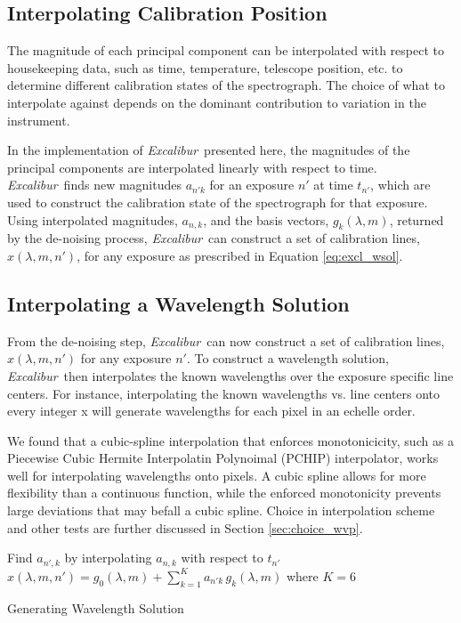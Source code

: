 \documentclass[modern]{aastex63}
\newcommand{\project}[1]{\textsl{#1}}
\newcommand{\name}{\project{Excalibur}}
\begin{document}
\subsection{Interpolating Calibration Position}
 \label{sec:interp_time}
The magnitude of each principal component can be interpolated with respect to housekeeping data, such as time, temperature, telescope position, etc. to determine different calibration states of the spectrograph.  The choice of what to interpolate against depends on the dominant contribution to variation in the instrument.

In the implementation of \name\ presented here, the magnitudes of the principal components are interpolated linearly with respect to time.  \name\ finds new magnitudes $a_{n'k}$ for an exposure $n'$ at time $t_{n'}$, which are used to construct the calibration state of the spectrograph for that exposure.  Using interpolated magnitudes, $a_{n,k}$, and the basis vectors, $g_k(\lambda,m)$, returned by the de-noising process, \name\ can construct a set of calibration lines, $x(\lambda,m,n') $, for any exposure as prescribed in Equation \ref{eq:excl_wsol}.


\subsection{Interpolating a Wavelength Solution} \label{sec:interp_wsol}
From the de-noising step, \name\ can now construct a set of calibration lines, $x(\lambda,m,n')$ for any exposure $n'$.  To construct a wavelength solution, \name\ then interpolates the known wavelengths over the exposure specific line centers.  For instance, interpolating the known wavelengths vs. line centers onto every integer x will generate wavelengths for each pixel in an echelle order.

We found that a cubic-spline interpolation that enforces monotonicicity, such as a Piecewise Cubic Hermite Interpolatin Polynoimal (PCHIP) interpolator, works well for interpolating wavelengths onto pixels.  A cubic spline allows for more flexibility than a continuous function, while the enforced monotonicity prevents large deviations that may befall a cubic spline.  Choice in interpolation scheme and other tests are further discussed in Section \ref{sec:choice_wvp}.

\begin{algorithm}
\SetAlgoLined
{}

Find $a_{n',k}$ by interpolating $a_{n,k}$ with respect to $t_{n'}$\;
$x(\lambda,m,n') = g_0(\lambda,m) + \sum_{k=1}^K a_{n'k}\,g_k(\lambda,m)$ where $K=6$\;
\caption{Generating Wavelength Solution}
\end{algorithm}
\end{document}
